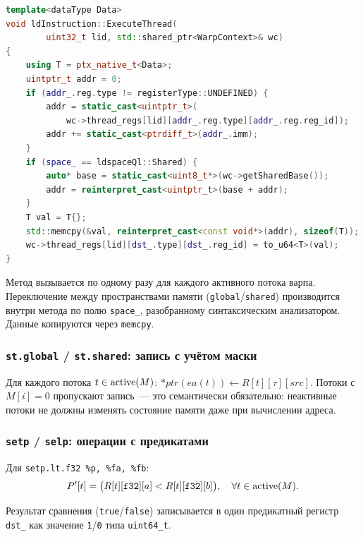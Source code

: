 \begin{lstlisting}[language=C++, caption={ldInstruction::ExecuteThread (executors.tpp)}]
template<dataType Data>
void ldInstruction::ExecuteThread(
        uint32_t lid, std::shared_ptr<WarpContext>& wc)
{
    using T = ptx_native_t<Data>;
    uintptr_t addr = 0;
    if (addr_.reg.type != registerType::UNDEFINED) {
        addr = static_cast<uintptr_t>(
            wc->thread_regs[lid][addr_.reg.type][addr_.reg.reg_id]);
        addr += static_cast<ptrdiff_t>(addr_.imm);
    }
    if (space_ == ldspaceQl::Shared) {
        auto* base = static_cast<uint8_t*>(wc->getSharedBase());
        addr = reinterpret_cast<uintptr_t>(base + addr);
    }
    T val = T{};
    std::memcpy(&val, reinterpret_cast<const void*>(addr), sizeof(T));
    wc->thread_regs[lid][dst_.type][dst_.reg_id] = to_u64<T>(val);
}
\end{lstlisting}

Метод вызывается по одному разу для каждого активного потока варпа.
Переключение между пространствами памяти (\texttt{global}/\texttt{shared})
производится внутри метода по полю \texttt{space\_}, разобранному
синтаксическим анализатором. Данные копируются через \texttt{memcpy}.

\subsubsection{\texttt{st.global} / \texttt{st.shared}: запись с учётом маски}

Для каждого потока $t \in \mathrm{active}(M)$:
$*\mathit{ptr}(ea(t)) \leftarrow R[t][\tau][\mathit{src}]$.
Потоки с $M[i]=0$ пропускают запись~--- это семантически обязательно:
неактивные потоки не должны изменять состояние памяти даже при
вычислении адреса.

\subsubsection{\texttt{setp} / \texttt{selp}: операции с предикатами}

Для \texttt{setp.lt.f32 \%p, \%fa, \%fb}:
\begin{equation}
  P'[t] = \bigl(R[t][\mathtt{f32}][a] < R[t][\mathtt{f32}][b]\bigr),
  \quad \forall t \in \mathrm{active}(M).
\end{equation}

Результат сравнения (\texttt{true}/\texttt{false}) записывается в один
предикатный регистр \texttt{dst\_} как значение \texttt{1}/\texttt{0}
типа \texttt{uint64\_t}.

